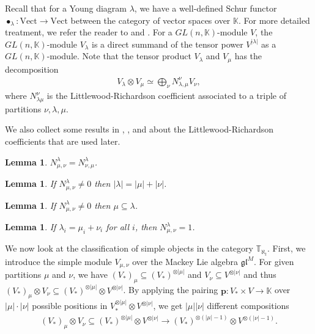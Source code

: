 \documentclass[openany, a4paper]{amsbook}
\newtheorem{lem}[thm]{Lemma}
\theoremstyle{definition}
\numberwithin{equation}{chapter}
\newcommand{\T}[1]{{\mathbb{T}}_{\aleph_{#1}}}
\begin{document}
Recall that for a Young diagram $\lambda$, we have a well-defined Schur functor $\bullet_\lambda: \text{Vect} \to \text{Vect}$ between the category of vector spaces over $\mathbb{K}$. For more detailed treatment, we refer the reader to \cite{fulton-yt} and \cite{fulton}. For a $GL(n, \mathbb{K})$-module $V$, the $GL(n, \mathbb{K})$-module $V_\lambda$ is a direct summand of the tensor power $V^ {\left\lvert\lambda \right\rvert }$ as a $GL(n, \mathbb{K})$-module. Note that the tensor product $V_\lambda$ and $V_\mu$ has the decomposition
\begin{align}
    V_\lambda \otimes V_\mu \simeq \bigoplus_{\nu} N^\nu_{\lambda, \mu} V_\nu ,
\end{align}
where $N^{\nu}_{\lambda \mu}$ is the Littlewood-Richardson coefficient associated to a triple of partitions $\nu, \lambda, \mu$. 

We also collect some results in \cite{fulton-yt}, \cite{fulton},  and \cite{p20} about the Littlewood-Richardson coefficients that are used later.
\begin{lem}
    $N^{\lambda}_{\mu, \nu} = N^{\lambda}_{\nu, \mu}$.
\end{lem}
\begin{lem}
    If $N^{\lambda}_{\mu, \nu} \neq 0$ then  $\left\lvert \lambda \right\rvert  = \left\lvert \mu \right\rvert + \left\lvert \nu \right\rvert$.
\end{lem}
\begin{lem}
    If $N^{\lambda}_{\mu, \nu} \neq 0$ then $ \mu \subseteq \lambda$.
\end{lem}
\begin{lem}
    If $\lambda_i = \mu_i + \nu_i$ for all $i$, then $N^{\lambda}_{\mu, \nu} = 1$.
\end{lem}

We now look at the classification of simple objects in the category $\T{t}$. First, we introduce the simple module $V_{\mu, \nu}$ over the Mackey Lie algebra $\mathfrak{gl}^M$. For given partitions $\mu$ and $\nu$, we have $(V_\ast)_\mu \subseteq (V_\ast)^{\otimes|\mu|}$ and $V_\nu \subseteq V^{\otimes|\nu|}$ and thus $(V_\ast)_\mu \otimes V_\nu \subseteq (V_\ast)^{\otimes|\mu|} \otimes V^{\otimes|\nu|}$. By applying the pairing $\mathbf{p}: V_\ast \times V \to \mathbb{K}$ over $|\mu| \cdot |\nu|$ possible positions in $V_*^{\otimes |\mu|} \otimes V^{\otimes |\nu|}$, we get $|\mu||\nu|$ different compositions
\begin{align} \label{traceless tensor}
    (V_\ast)_\mu \otimes V_\nu \subseteq (V_\ast)^{\otimes|\mu|} \otimes V^{\otimes|\nu|} \to (V_\ast)^{\otimes(|\mu|-1)} \otimes V^{\otimes(|\nu|-1)}. 
\end{align}
\end{document}
